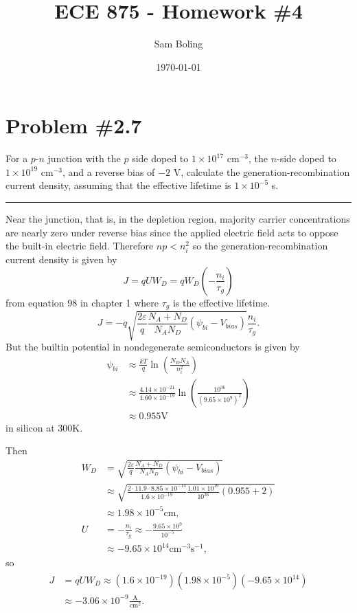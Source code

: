 \documentclass{article}
\title{ECE 875 - Homework \#4}
\author{Sam Boling}
\date{\today}
\newcommand{\horline}
           {\begin{center}
              \noindent\rule{8cm}{0.4pt}
            \end{center}}
\begin{document}
\maketitle

\section*{Problem \#2.7}
For a $p$-$n$ junction with the $p$ side doped to $1 \times 10^{17}$ cm$^{-3}$,
the $n$-side doped to $1 \times 10^{19}$ cm$^{-3}$, and a reverse bias of 
$-2$ V, calculate the generation-recombination current density, assuming that 
the effective lifetime is $1 \times 10^{-5}$ s.
\horline
Near the junction, that is, in the depletion region, majority carrier 
concentrations are nearly zero under reverse bias since the applied
electric field acts to oppose the built-in electric field. Therefore 
$np < n_i^2$ so the generation-recombination current density is given by
$$
J = q U W_D = q W_D \left( -\frac{n_i}{\tau_g} \right)
$$
from equation 98 in chapter 1 where $\tau_g$ is the effective lifetime.
$$
J = -q \sqrt{\frac{2 \varepsilon}{q}
             \frac{N_A + N_D}{N_A N_D} (\psi_{bi} - V_{bias})} 
       \frac{n_i}{\tau_g}.
$$
But the builtin potential in nondegenerate semiconductors is given by
\begin{align*}
\psi_{bi} &\approx \frac{kT}{q} \ln \left(\frac{N_D N_A}{n_i^2}\right) \\
          &\approx \frac{4.14 \times 10^{-21}}{1.60 \times 10^{-19}}
                  \ln\left(\frac{10^{36}}{(9.65 \times 10^9)^2}\right) \\
          &\approx 0.955 \mathrm{V}
\end{align*}
in silicon at 300K.

Then
\begin{align*}
W_D &= \sqrt{\frac{2\varepsilon}{q} 
            \frac{N_A + N_D}{N_A N_D}
            (\psi_{bi} - V_{bias})} \\
    &\approx
       \sqrt{\frac{2 \cdot 11.9 \cdot 8.85 \times 10^{-14}}
                  {1.6 \times 10^{-19}}
             \frac{1.01 \times 10^{19}}
                  {10^{36}}
             (0.955 + 2)} \\
    &\approx 1.98 \times 10^{-5} \mathrm{cm}, \\
U   &= -\frac{n_i}{\tau_g} \approx -\frac{9.65 \times 10^{9}}{10^{-5}} \\
    &\approx -9.65 \times 10^{14} \mathrm{cm}^{-3} \mathrm{s}^{-1},
\end{align*}
so
\begin{align*}
J &= q U W_D 
   \approx (1.6 \times 10^{-19})(1.98 \times 10^{-5})(-9.65 \times 10^{14}) \\
  &\approx -3.06 \times 10^{-9} \frac{\mathrm{A}}{\mathrm{cm}^2}.
\end{align*}
\end{document}
